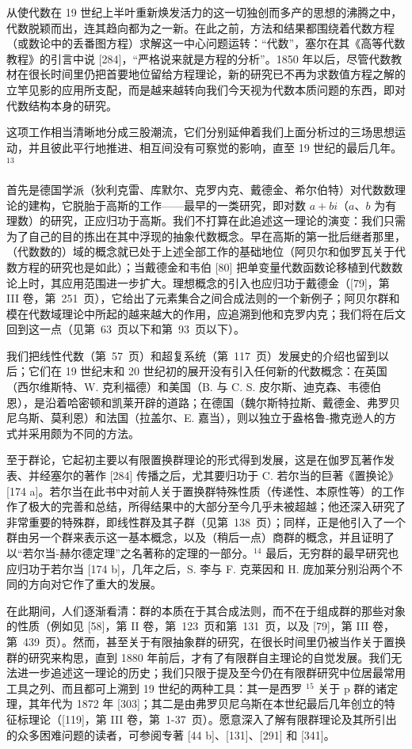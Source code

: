 从使代数在 19 世纪上半叶重新焕发活力的这一切独创而多产的思想的沸腾之中，代数脱颖而出，连其趋向都为之一新。在此之前，方法和结果都围绕着代数方程（或数论中的丢番图方程）求解这一中心问题运转：“代数”，塞尔在其《高等代数教程》的引言中说 {[}284{]}，“严格说来就是方程的分析”。1850 年以后，尽管代数教材在很长时间里仍把首要地位留给方程理论，新的研究已不再为求数值方程之解的立竿见影的应用所支配，而是越来越转向我们今天视为代数本质问题的东西，即对代数结构本身的研究。

这项工作相当清晰地分成三股潮流，它们分别延伸着我们上面分析过的三场思想运动，并且彼此平行地推进、相互间没有可察觉的影响，直至 19 世纪的最后几年。\(^{13}\)

首先是德国学派（狄利克雷、库默尔、克罗内克、戴德金、希尔伯特）对代数数理论的建构，它脱胎于高斯的工作——最早的一类研究，即对数 \(a + bi\)（\(a\)、\(b\) 为有理数）的研究，正应归功于高斯。我们不打算在此追述这一理论的演变：我们只需为了自己的目的拣出在其中浮现的抽象代数概念。早在高斯的第一批后继者那里，（代数数的）域的概念就已处于上述全部工作的基础地位（阿贝尔和伽罗瓦关于代数方程的研究也是如此）；当戴德金和韦伯 {[}80{]} 把单变量代数函数论移植到代数数论上时，其应用范围进一步扩大。理想概念的引入也应归功于戴德金（{[}79{]}，第 III 卷，第~251~页），它给出了元素集合之间合成法则的一个新例子；阿贝尔群和模在代数域理论中所起的越来越大的作用，应追溯到他和克罗内克；我们将在后文回到这一点（见第~63~页以下和第~93~页以下）。

我们把线性代数（第~57~页）和超复系统（第~117~页）发展史的介绍也留到以后；它们在 19 世纪末和 20 世纪初的展开没有引入任何新的代数概念：在英国（西尔维斯特、W. 克利福德）和美国（B. 与 C. S. 皮尔斯、迪克森、韦德伯恩），是沿着哈密顿和凯莱开辟的道路；在德国（魏尔斯特拉斯、戴德金、弗罗贝尼乌斯、莫利恩）和法国（拉盖尔、E. 嘉当），则以独立于盎格鲁-撒克逊人的方式并采用颇为不同的方法。

至于群论，它起初主要以有限置换群理论的形式得到发展，这是在伽罗瓦著作发表、并经塞尔的著作 {[}284{]} 传播之后，尤其要归功于 C. 若尔当的巨著《置换论》{[}174 a{]}。若尔当在此书中对前人关于置换群特殊性质（传递性、本原性等）的工作作了极大的完善和总结，所得结果中的大部分至今几乎未被超越；他还深入研究了非常重要的特殊群，即线性群及其子群（见第~138~页）；同样，正是他引入了一个群由另一个群来表示这一基本概念，以及（稍后一点）商群的概念，并且证明了以“若尔当-赫尔德定理”之名著称的定理的一部分。\(^{14}\) 最后，无穷群的最早研究也应归功于若尔当 {[}174 b{]}，几年之后，S. 李与 F. 克莱因和 H. 庞加莱分别沿两个不同的方向对它作了重大的发展。

在此期间，人们逐渐看清：群的本质在于其合成法则，而不在于组成群的那些对象的性质（例如见 {[}58{]}，第 II 卷，第~123~页和第~131~页，以及 {[}79{]}，第 III 卷，第~439~页）。然而，甚至关于有限抽象群的研究，在很长时间里仍被当作关于置换群的研究来构思，直到 1880 年前后，才有了有限群自主理论的自觉发展。我们无法进一步追述这一理论的历史；我们只限于提及至今仍在有限群研究中位居最常用工具之列、而且都可上溯到 19 世纪的两种工具：其一是西罗 \(^{15}\) 关于 p 群的诸定理，其年代为 1872 年 {[}303{]}；其二是由弗罗贝尼乌斯在本世纪最后几年创立的特征标理论（{[}119{]}，第 III 卷，第~1-37~页）。愿意深入了解有限群理论及其所引出的众多困难问题的读者，可参阅专著 {[}44 b{]}、{[}131{]}、{[}291{]} 和 {[}341{]}。

